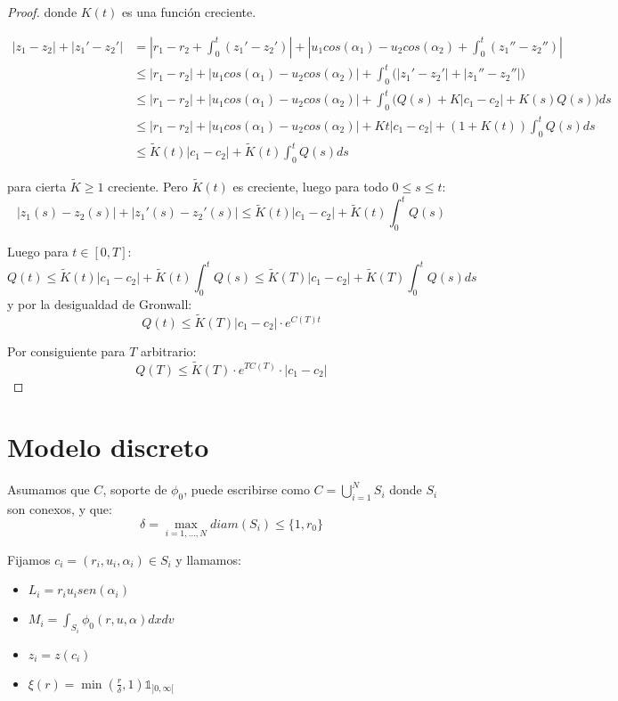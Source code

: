 \documentclass[a4paper,10pt]{scrartcl}
\theoremstyle{definition}
\numberwithin{equation}{section}
\begin{document}
\begin{proof}
 donde $K(t)$ es una función creciente.
 
 \begin{align*}
  |z_1 - z_2| + |z_1' - z_2'| &= \left|r_1 - r_2 + \int_0^t (z_1' - z_2')\right| + \left|u_1 cos(\alpha_1) - u_2 cos(\alpha_2) + \int_0^t (z_1'' - z_2'') \right|\\
  &\le |r_1 - r_2| + |u_1 cos(\alpha_1) - u_2 cos(\alpha_2)| + \int_0^t \bigg(|z_1' - z_2'| + |z_1'' - z_2''|\bigg) \\
  &\le |r_1 - r_2| + |u_1 cos(\alpha_1) - u_2 cos(\alpha_2)| + \int_0^t \bigg(Q(s) + K|c_1 - c_2| + K(s)Q(s)\bigg) ds \\
  &\le |r_1 - r_2| + |u_1 cos(\alpha_1) - u_2 cos(\alpha_2)| + Kt|c_1 - c_2| + (1 + K(t)) \int_0^t Q(s) ds\\
  &\le \widetilde{K}(t)|c_1 - c_2| + \widetilde{K}(t) \int_0^t Q(s) ds
 \end{align*}

 para cierta $\widetilde{K} \ge 1$ creciente. Pero $\widetilde{K}(t)$ es creciente, luego para todo $0 \le s \le t$:
 \[
    |z_1(s) - z_2(s)| + |z_1'(s) - z_2'(s)|  \le \widetilde{K}(t)|c_1 - c_2| + \widetilde{K}(t) \int_0^t Q(s)
 \]

 Luego para $t\in [0,T]$:
 \[
  Q(t) \le \widetilde{K}(t)|c_1 - c_2| + \widetilde{K}(t) \int_0^t Q(s) \le \widetilde{K}(T)|c_1 - c_2| + \widetilde{K}(T) \int_0^t Q(s)ds
 \]
 y por la desigualdad de Gronwall:
 \[
  Q(t) \le \widetilde{K}(T)|c_1 - c_2| \cdot e^{C(T)t}
 \]
 
 Por consiguiente para $T$ arbitrario:
 \[
  Q(T) \le \widetilde{K}(T)\cdot e^{TC(T)} \cdot |c_1 - c_2|
 \]
 
\end{proof}

\section{Modelo discreto}
Asumamos que $C$, soporte de $\phi_0$, puede escribirse como $C= \bigcup_{i=1}^N S_i$ donde $S_i$ son conexos, y que:
\[
    \delta = \max_{i=1,\ldots, N} diam(S_i) \le \{1,r_0\}
\]

Fijamos $c_i = (r_i, u_i, \alpha_i) \in S_i$ y llamamos:
\begin{itemize}
\item $L_i = r_i u_i sen(\alpha_i)$
\item $M_i = \int_{S_i} \phi_0(r,u,\alpha) dxdv$
\item $z_i = z(c_i)$
\item $\xi(r) = \min\left(\frac{r}{\delta},1\right) \mathds{1}_{]0,\infty[}$
\end{itemize}
\end{document}
